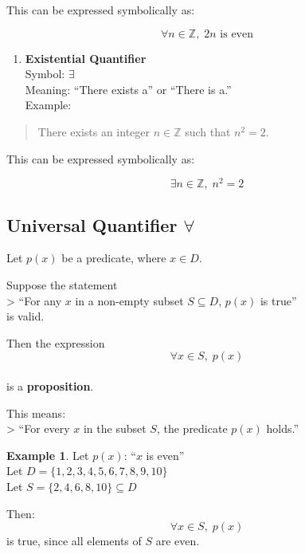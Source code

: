 \documentclass[
]{book}
\providecommand{\tightlist}{%
  \setlength{\itemsep}{0pt}\setlength{\parskip}{0pt}}
\theoremstyle{definition}
\theoremstyle{definition}
\newtheorem{example}{Example}[chapter]
\theoremstyle{definition}
\theoremstyle{definition}
\theoremstyle{remark}
\begin{document}
This can be expressed symbolically as:

\[
\forall n \in \mathbb{Z},\; 2n \text{ is even}
\]

\begin{enumerate}
\def\labelenumi{\arabic{enumi}.}
\setcounter{enumi}{1}
\tightlist
\item
  \textbf{Existential Quantifier}\\
  Symbol: \(\exists\)\\
  Meaning: ``There exists a'' or ``There is a.''\\
  Example:
\end{enumerate}

\begin{quote}
There exists an integer \(n \in \mathbb{Z}\) such that \(n^2 = 2\).
\end{quote}

This can be expressed symbolically as:

\[
\exists n \in \mathbb{Z},\; n^2 = 2
\]

\subsection{\texorpdfstring{Universal Quantifier \(\forall\)}{Universal Quantifier \textbackslash forall}}\label{universal-quantifier-forall}

Let \(p(x)\) be a predicate, where \(x \in D\).

Suppose the statement\\
\textgreater{} ``For any \(x\) in a non-empty subset \(S \subseteq D\), \(p(x)\) is true''\\
is valid.

Then the expression\\
\[
\forall x \in S,\; p(x)
\]\\
is a \textbf{proposition}.

This means:\\
\textgreater{} ``For every \(x\) in the subset \(S\), the predicate \(p(x)\) holds.''

\begin{example}
\protect\hypertarget{exm:unnamed-chunk-45}{}\label{exm:unnamed-chunk-45}Let \(p(x)\): ``\(x\) is even''\\
Let \(D = \{1, 2, 3, 4, 5, 6, 7, 8, 9, 10\}\)\\
Let \(S = \{2, 4, 6, 8, 10\} \subseteq D\)

Then:
\[
\forall x \in S,\; p(x)
\]
is true, since all elements of \(S\) are even.
\end{example}
\end{document}
